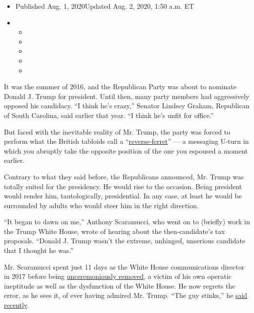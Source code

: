 \begin{itemize}
\item
  Published Aug. 1, 2020Updated Aug. 2, 2020, 1:50 a.m. ET
\item
  \begin{itemize}
  \item
  \item
  \item
  \item
  \item
  \end{itemize}
\end{itemize}

It was the summer of 2016, and the Republican Party was about to
nominate Donald J. Trump for president. Until then, many party members
had aggressively opposed his candidacy. ``I think he's crazy,'' Senator
Lindsey Graham, Republican of South Carolina, said earlier that year.
``I think he's unfit for office.''

But faced with the inevitable reality of Mr. Trump, the party was forced
to perform what the British tabloids call a
``\href{https://www.forbes.com/sites/andrewbusby/2019/03/29/the-reverse-ferret-and-the-department-store-how-today-became-debs-day/\#6eebddc017de}{reverse-ferret}''
--- a messaging U-turn in which you abruptly take the opposite position
of the one you espoused a moment earlier.

Contrary to what they said before, the Republicans announced, Mr. Trump
was totally suited for the presidency. He would rise to the occasion.
Being president would render him, tautologically, presidential. In any
case, at least he would be surrounded by adults who would steer him in
the right direction.

``It began to dawn on me,'' Anthony Scaramucci, who went on to (briefly)
work in the Trump White House, wrote of hearing about the
then-candidate's tax proposals. ``Donald J. Trump wasn't the extreme,
unhinged, unserious candidate that I thought he was.''

Mr. Scaramucci spent just 11 days as the White House communications
director in 2017 before being
\href{https://www.nytimes.com/2017/07/31/us/politics/trump-white-house-obamacare-health.html}{unceremoniously
removed}, a victim of his own operatic ineptitude as well as the
dysfunction of the White House. He now regrets the error, as he sees it,
of ever having admired Mr. Trump. ``The guy stinks,'' he
\href{https://www.theguardian.com/tv-and-radio/2020/jul/17/the-guy-stinks-and-hes-a-racist-anthony-scaramucci-on-donald-trump}{said
recently}.

